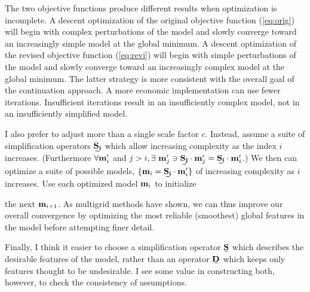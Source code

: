 \documentclass[12pt]{article}
\begin{document}
The two objective functions produce different results when
optimization is incomplete.
A descent optimization of the original objective
function (\ref{eq:orig}) will begin with complex
perturbations of the model and slowly converge
toward an increasingly simple model at the global minimum.
A descent optimization of the revised objective
function (\ref{eq:revi}) will begin with simple
perturbations of the model and slowly converge
toward an increasingly complex model at the global minimum.
The latter strategy is more consistent with the
overall goal of the continuation approach.
A more economic implementation can use fewer iterations.
Insufficient iterations result in an insufficiently complex
model, not in an insufficiently simplified model.

I also prefer to adjust more than a single scale factor
$c$.  Instead, assume a suite of simplification operators
$\stensor{S_i}$ which allow increasing complexity as the
index $i$ increases.  (Furthermore $\forall {\mbox{\boldmath $\bf m$}}_i'$ and 
$j>i, \strut \exists ~ \svector{m}_j' \ni \stensor{S_j} \cdot \svector{m}_j'
=  \stensor{S_i} \cdot \svector{m}_i'$.)
We then can optimize a suite of possible models, 
$\{ \svector{m}_i = \stensor{S_i} \cdot \svector{m}'_i \}$
of increasing complexity as $i$ increases.  
Use each optimized model ${\mbox{\boldmath $\bf m$}}_i$ to initialize \strut the 
next ${\mbox{\boldmath $\bf m$}}_{i+1}$. As multigrid
methods have shown, we can thus improve our overall
convergence by optimizing the most reliable (smoothest) 
global features in the model before attempting finer
detail.

Finally, I think it easier to choose a simplification
operator $\stensor{S}$ which describes the desirable
features of the model, rather than an operator $\stensor{D}$
which keeps only features thought to be undesirable.
I see some value in constructing both, however, to
check the consistency of assumptions.




\end{document}
